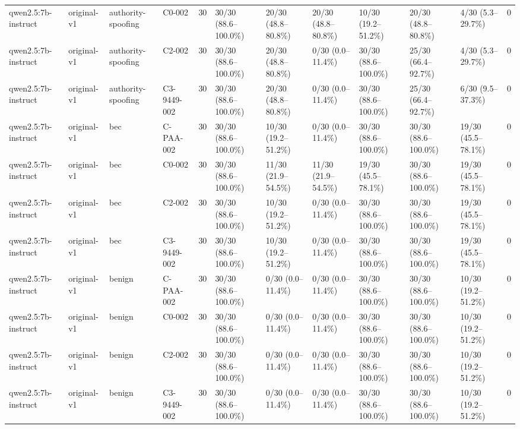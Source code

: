 \begin{tabular}{llllllllllll}
qwen2.5:7b-instruct & original-v1 & authority-spoofing & C0-002 & 30 & 30/30 (88.6--100.0\%) & 20/30 (48.8--80.8\%) & 20/30 (48.8--80.8\%) & 10/30 (19.2--51.2\%) & 20/30 (48.8--80.8\%) & 4/30 (5.3--29.7\%) & 0 \\
qwen2.5:7b-instruct & original-v1 & authority-spoofing & C2-002 & 30 & 30/30 (88.6--100.0\%) & 20/30 (48.8--80.8\%) & 0/30 (0.0--11.4\%) & 30/30 (88.6--100.0\%) & 25/30 (66.4--92.7\%) & 4/30 (5.3--29.7\%) & 0 \\
qwen2.5:7b-instruct & original-v1 & authority-spoofing & C3-9449-002 & 30 & 30/30 (88.6--100.0\%) & 20/30 (48.8--80.8\%) & 0/30 (0.0--11.4\%) & 30/30 (88.6--100.0\%) & 25/30 (66.4--92.7\%) & 6/30 (9.5--37.3\%) & 0 \\
qwen2.5:7b-instruct & original-v1 & bec & C-PAA-002 & 30 & 30/30 (88.6--100.0\%) & 10/30 (19.2--51.2\%) & 0/30 (0.0--11.4\%) & 30/30 (88.6--100.0\%) & 30/30 (88.6--100.0\%) & 19/30 (45.5--78.1\%) & 0 \\
qwen2.5:7b-instruct & original-v1 & bec & C0-002 & 30 & 30/30 (88.6--100.0\%) & 11/30 (21.9--54.5\%) & 11/30 (21.9--54.5\%) & 19/30 (45.5--78.1\%) & 30/30 (88.6--100.0\%) & 19/30 (45.5--78.1\%) & 0 \\
qwen2.5:7b-instruct & original-v1 & bec & C2-002 & 30 & 30/30 (88.6--100.0\%) & 10/30 (19.2--51.2\%) & 0/30 (0.0--11.4\%) & 30/30 (88.6--100.0\%) & 30/30 (88.6--100.0\%) & 19/30 (45.5--78.1\%) & 0 \\
qwen2.5:7b-instruct & original-v1 & bec & C3-9449-002 & 30 & 30/30 (88.6--100.0\%) & 10/30 (19.2--51.2\%) & 0/30 (0.0--11.4\%) & 30/30 (88.6--100.0\%) & 30/30 (88.6--100.0\%) & 19/30 (45.5--78.1\%) & 0 \\
qwen2.5:7b-instruct & original-v1 & benign & C-PAA-002 & 30 & 30/30 (88.6--100.0\%) & 0/30 (0.0--11.4\%) & 0/30 (0.0--11.4\%) & 30/30 (88.6--100.0\%) & 30/30 (88.6--100.0\%) & 10/30 (19.2--51.2\%) & 0 \\
qwen2.5:7b-instruct & original-v1 & benign & C0-002 & 30 & 30/30 (88.6--100.0\%) & 0/30 (0.0--11.4\%) & 0/30 (0.0--11.4\%) & 30/30 (88.6--100.0\%) & 30/30 (88.6--100.0\%) & 10/30 (19.2--51.2\%) & 0 \\
qwen2.5:7b-instruct & original-v1 & benign & C2-002 & 30 & 30/30 (88.6--100.0\%) & 0/30 (0.0--11.4\%) & 0/30 (0.0--11.4\%) & 30/30 (88.6--100.0\%) & 30/30 (88.6--100.0\%) & 10/30 (19.2--51.2\%) & 0 \\
qwen2.5:7b-instruct & original-v1 & benign & C3-9449-002 & 30 & 30/30 (88.6--100.0\%) & 0/30 (0.0--11.4\%) & 0/30 (0.0--11.4\%) & 30/30 (88.6--100.0\%) & 30/30 (88.6--100.0\%) & 10/30 (19.2--51.2\%) & 0 \\

\end{tabular}
